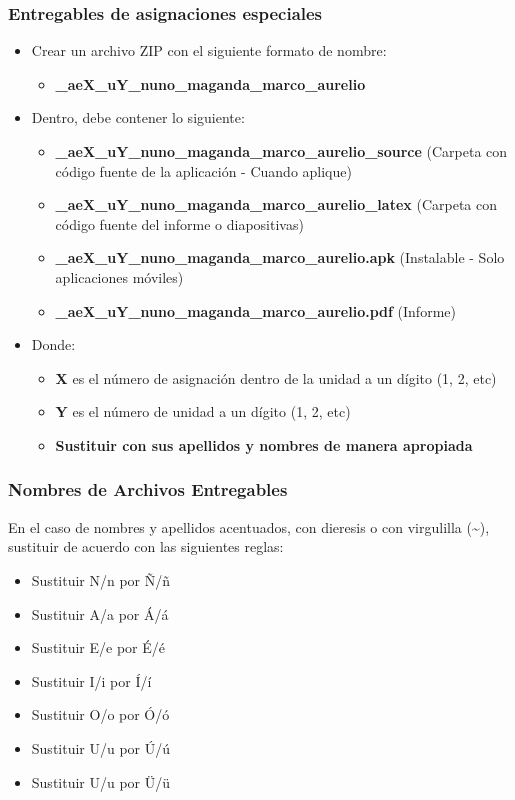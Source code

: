 \begin{frame}
\frametitle{Entregables de asignaciones especiales}
    \begin{itemize}
    \item Crear un archivo ZIP con el siguiente formato de nombre:
    \begin{itemize}
        \item \textbf{\clavegrupo\_aeX\_uY\_nuno\_maganda\_marco\_aurelio}
    \end{itemize}
    \item Dentro, debe contener lo siguiente:
        \begin{itemize}
        \item \textbf{\clavegrupo\_aeX\_uY\_nuno\_maganda\_marco\_aurelio\_source} (Carpeta con c\'odigo fuente de la aplicaci\'on - Cuando aplique)
        \item \textbf{\clavegrupo\_aeX\_uY\_nuno\_maganda\_marco\_aurelio\_latex} (Carpeta con c\'odigo fuente del informe o diapositivas)
        \item \textbf{\clavegrupo\_aeX\_uY\_nuno\_maganda\_marco\_aurelio.apk} (Instalable - Solo aplicaciones móviles)
        \item \textbf{\clavegrupo\_aeX\_uY\_nuno\_maganda\_marco\_aurelio.pdf} (Informe)
        \end{itemize}
    \item Donde:
        \begin{itemize}
        \item \textbf{X} es el n\'umero de asignación dentro de la unidad a un d\'igito (1, 2, etc)
        \item \textbf{Y} es el n\'umero de unidad a un d\'igito (1, 2, etc)
        \item \textbf{Sustituir con sus apellidos y nombres de manera apropiada} 
        \end{itemize}
    \end{itemize}
\end{frame}





\begin{frame}
\frametitle{Nombres de Archivos Entregables}
En el caso de nombres y apellidos acentuados, con dieresis o con virgulilla (\textasciitilde{}), sustituir de acuerdo con las siguientes reglas:
\begin{itemize}
\item Sustituir N/n por \~N/\~n
\item Sustituir A/a por \'A/\'a
\item Sustituir E/e por \'E/\'e
\item Sustituir I/i por \'I/\'i
\item Sustituir O/o por \'O/\'o
\item Sustituir U/u por \'U/\'u
\item Sustituir U/u por \"U/\"u
\end{itemize}
\end{frame}



